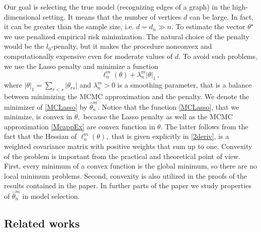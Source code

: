 \documentclass[twoside,11pt]{article}
\def\llnm{\ell_n^m}
\def\th{\theta}
\def\ths{\th^\star}
\def\hth{\hat{\theta}}
\begin{document}
Our goal is selecting the true model (recognizing edges of a graph) in the high-dimensional setting. It means that the number 
of vertices $d$ can be large. In fact, it can be  greater than the sample size, i.e. $d= d_n \gg n.$ To estimate the vector $\ths$ we use penalized empirical risk minimization.
The natural choice of the penalty would be  the $l_0$-penalty, but it makes the procedure nonconvex and computationally expensive even for moderate values of $d.$ To avoid such problems, we use the Lasso penalty and minimize a function
\begin{equation}
\label{MCLasso}
\llnm(\th) + \lambda_n^m |\th|_1\,,
\end{equation}
where $|\th|_1 = \sum_{r<s} |\th_{rs}|$ and 
$\lambda_n^m >0$ is a smoothing parameter, that is a balance between minimizing 
the MCMC approximation and the penalty. 
We denote the minimizer of \eqref{MCLasso} by $\hth _n^m.$ 
Notice that the function \eqref{MCLasso}, that we minimize, is convex in $\th,$ because the Lasso penalty as well as the MCMC approximation \eqref{McappEx} are convex function in $\th.$ The latter follows from the fact that the Hessian of $\llnm(\th),$ that is given explicitly in \eqref{2deriv}, is  a weighted covariance matrix with positive weights that sum up to one. 
Convexity of the problem is important from the practical and theoretical point of view. First,
every minimum of a convex function is the global minimum, so there are no local minimum problems. Second, convexity is also utilized in the proofs of the results contained in the paper.
In further parts of the paper we study properties of $\hth _n^m$ in model selection.


\subsection{Related works}
\label{related works}
\end{document}

